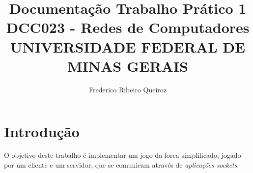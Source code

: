 \documentclass[12pt]{article}
\begin{document}
\title{%
    Documentação Trabalho Prático 1 \\
    \vspace{2em}
    \large DCC023 - Redes de Computadores \\
    UNIVERSIDADE FEDERAL DE MINAS GERAIS}

\author{Frederico Ribeiro Queiroz}
\maketitle

\section{Introdução}
O objetivo deste trabalho é implementar um jogo da forca simplificado, jogado por um cliente
e um servidor, que se comunicam através de \emph{aplicações sockets}. \par
\end{document}
